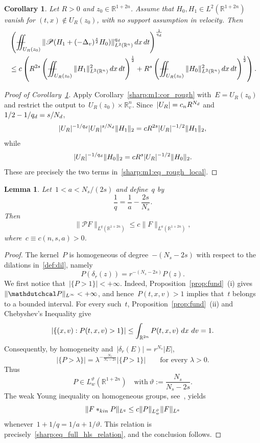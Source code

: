 \documentclass[leqno,10pt]{amsart}
\theoremstyle{plain}
\newtheorem{lemma}{Lemma}[section]
\newtheorem{cor}{Corollary}[section]
\theoremstyle{remark}
\numberwithin{equation}{section}
\def\dx{\,{\rm d}x}
\def\dt{\,{\rm d}t}
\def \d{\,{\rm d}}
\def\er{\mathbb{R}}
\def\ern{\mathbb{R}^n}
\def\Xiint#1{\mathchoice
    {\XXiint\displaystyle\textstyle{#1}}%
    {\XXiint\textstyle\scriptstyle{#1}}%
    {\XXiint\scriptstyle\scriptscriptstyle{#1}}%
    {\XXiint\scriptscriptstyle\scriptscriptstyle{#1}}%
    \!\iint}
\def\XXiint#1#2#3{\setbox0=\hbox{$#1{#2#3}{\iint}$}
    \vcenter{\hbox{$#2#3$}}\kern-0.5\wd0}
\def\biint{\Xiint{-\!-}}
\begin{document}
{\begin{cor}\label{sharp:m1:cor_rough_local}
Let $R>0$ and $z_0\in\er^{1+2n}$. Assume that $H_0,H_1\in L^2(\er^{1+2n})$ vanish for $(t,x)\notin U_R(z_0)$, with no support assumption in velocity. Then
\begin{align}
\label{sharp:m1:eq_rough_local}
&\left(\biint_{U_R(z_0)} \| \mathscr P(H_1+(-\Delta_v)^\frac{s}{2}H_0) \|_{L^2(\mathbb{R}^{n})}^{q_d} \dx\dt\right)^\frac{1}{q_d}  \\ \nonumber
&\leq c \left( R^{2s}  \left(\biint_{U_R(z_0)} \| H_1 \|_{L^2(\mathbb{R}^{n})}^{2} \dx\dt\right)^\frac{1}{2}  
+ R^s \left(\biint_{U_R(z_0)} \| H_0 \|_{L^2(\mathbb{R}^{n})}^{2} \dx\dt\right)^\frac{1}{2}    \right).
\end{align}
\end{cor}


\begin{proof}[Proof of Corollary~\ref{sharp:m1:cor_rough_local}]
Apply Corollary~\ref{sharp:m1:cor_rough} with~$E=U_R(z_0)$ and restrict the output to~$U_R(z_0)\times\ern_v$. Since~$|U_R|=c_nR^{N_{\rm d}}$ and~$1/2-1/q_{\rm d}=s/N_{\rm d}$,
\[
|U_R|^{-1/q_{\rm d}}|U_R|^{s/N_{\rm d}}\|H_1\|_2
=c R^{2s}|U_R|^{-1/2}\|H_1\|_2,
\]
while
\[
|U_R|^{-1/q_{\rm d}}\|H_0\|_2
=c R^s|U_R|^{-1/2}\|H_0\|_2.
\]
These are precisely the two terms in~\eqref{sharp:m1:eq_rough_local}.
\end{proof}


\begin{lemma}\label{lemma:fundamental}
Let~$1<a<N_s/(2s)$ and define~$q$ by
\begin{equation}\label{sharp:eq_full_hls_relation}
\frac1q=\frac1a-\frac{2s}{N_s}.
\end{equation}
Then
\begin{equation}\label{sharp:eq_full_hls}
\|\mathscr P F\|_{L^q(\er^{1+2n})}
\leq c\|F\|_{L^a(\er^{1+2n})},
\end{equation}
where~$c\equiv c(n,s,a)>0$.
\end{lemma}

\begin{proof}
The kernel~$P$ is homogeneous of degree~$-(N_s-2s)$ with respect to the dilations in~\eqref{def:dil}, namely
$$
P(\delta_r (z))=r^{-(N_s-2s)}P(z).
$$
We first notice that~$|\{P>1\}|<+\infty$. Indeed, Proposition~\ref{prop:fund}~\textup{(i)} gives~$\|\mathdutchcal P\|_{L^\infty}<+\infty$, and hence~$P(t,x,v)>1$ implies that~$t$ belongs to a bounded interval. For every such~$t$, Proposition~\ref{prop:fund}~\textup{(ii)} and Chebyshev's Inequality give
$$
|\{(x,v):P(t,x,v)>1\}|\leq\int_{\er^{2n}}P(t,x,v)\,\d x\,\d v=1.
$$
Consequently, by homogeneity and~$|\delta_r(E)|=r^{N_s}|E|$,
$$
|\{P>\lambda\}|
=\lambda^{-\frac{N_s}{N_s-2s}}|\{P>1\}|
\qquad\text{for every }\lambda>0.
$$
Thus
$$
P\in L^{\vartheta}_w(\er^{1+2n})
\quad \text{with}~\vartheta:=\frac{N_s}{N_s-2s}.
$$
 The weak Young inequality on homogeneous groups, see~\cite[Proposition~1.10]{Fol75}, yields
$$
\|F\ast_{\rm kin}P\|_{L^q}
\leq c\|P\|_{L^{\vartheta}_w}\|F\|_{L^a}
$$
whenever~$1+1/q=1/a+1/\vartheta$. This relation is precisely~\eqref{sharp:eq_full_hls_relation}, and the conclusion follows.
\end{proof}


}
\end{document}
